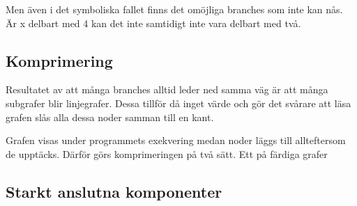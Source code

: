 Men även i det symboliska fallet finns det omöjliga branches som inte
kan nås. Är x delbart med 4 kan det inte samtidigt inte vara delbart
med två.

\subsection{Komprimering}
Resultatet av att många branches alltid leder ned samma väg är att
många subgrafer blir linjegrafer. Dessa tillför då inget värde och gör
det svårare att läsa grafen slås alla dessa noder samman till en kant.

Grafen visas under programmets exekvering medan noder läggs till
allteftersom de upptäcks. Därför görs komprimeringen på två sätt. Ett
på färdiga grafer 

\subsection{Starkt anslutna komponenter}
